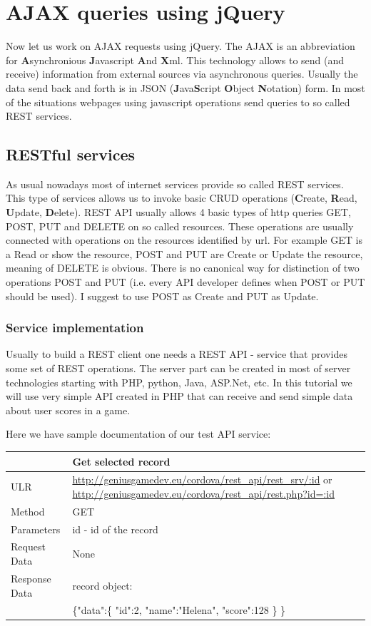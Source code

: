 \chapter{AJAX queries using jQuery }

Now let us work on AJAX requests using jQuery. The AJAX is an abbreviation for \textbf{A}synchronious \textbf{J}avascript \textbf{A}nd \textbf{X}ml. This technology allows to send (and receive) information from external sources via asynchronous queries. Usually the data send back and forth is in JSON (\textbf{J}ava\textbf{S}cript \textbf{O}bject \textbf{N}otation) form. In most of the situations webpages using javascript operations send queries to so called REST services.

\section{RESTful services}
As usual nowadays most of internet services provide so called REST services. This type of services allows us to invoke basic CRUD operations (\textbf{C}reate, \textbf{R}ead, \textbf{U}pdate, \textbf{D}elete). REST API usually allows 4 basic types of http queries GET, POST, PUT and DELETE on so called resources. These operations are usually connected with operations on the resources identified by url. For example GET is a Read or show the resource, POST and PUT are Create or Update the resource, meaning of DELETE is obvious. There is no canonical way for distinction of two operations POST and PUT (i.e. every API developer defines when POST or PUT should be used). I suggest to use POST as Create and PUT as Update.

\subsection{Service implementation}
Usually to build a REST client one needs a REST API - service that provides some set of REST operations. The server part can be created in most of server technologies starting with PHP, python, Java, ASP.Net, etc. In this tutorial we will use very simple API created in PHP that can receive and send simple data about user scores in a game. 

Here we have sample documentation of our test API service:

\begin{tabularx}{\textwidth}{|l|X|}
\hline
&\textbf{Get selected record}\\\hline
ULR &   \url{http://geniusgamedev.eu/cordova/rest_api/rest_srv/:id} or \url{http://geniusgamedev.eu/cordova/rest_api/rest.php?id=:id}\\\hline
Method  & GET\\\hline
Parameters  & id - id of the record \\\hline
Request Data & None\\\hline
Response Data & record object:\\
&
\{"data":\{
    "id":2,
    "name":"Helena",
    "score":128
    \}
\}
\\\hline
\end{tabularx}

